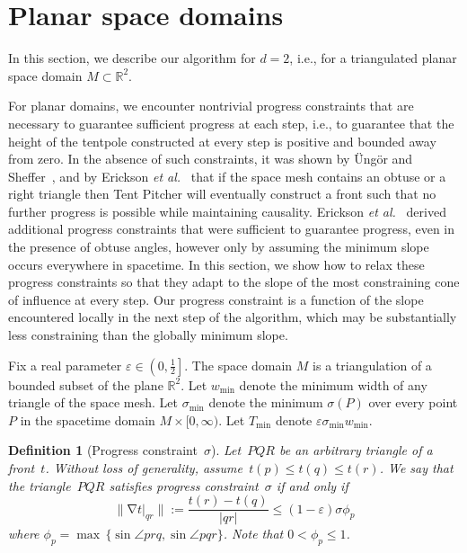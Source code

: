 \documentclass[twocolumn]{article}
\def\Real{\ensuremath{\mathbb{R}}}
\def\minW{\ensuremath{w_{\text{min}}}}
\def\S{\ensuremath{\sigma}}
\def\minS{\ensuremath{\S_{\text{min}}}}
\def\minT{\ensuremath{T_{\text{min}}}}
\def\e{\ensuremath{\varepsilon}}
\def\sp{\ensuremath{M}}
\def\fp{\ensuremath{P}}
\def\fq{\ensuremath{Q}}
\def\fr{\ensuremath{R}}
\DeclareMathOperator{\grad}{\ensuremath{\nabla}}
\def\abs#1{\ensuremath{\mathopen| #1 \mathclose|}}
\def\norm#1{\ensuremath{\mathopen\| #1 \mathclose\|}}
\def\rest#1#2{\ensuremath{\left. #1 \right|_{#2}}}
\def\half{\ensuremath{\frac{1}{2}}}
\def\etal{\textsl{et al.}}
\def\Ungor{\"Ung\"or}
\newtheorem{definition}{Definition}
\begin{document}
\section{Planar space domains}
\label{sec:2d}

In this section, we describe our algorithm for $d=2$, i.e., for a
triangulated planar space domain $\sp \subset \Real^2$.

For planar domains, we encounter nontrivial progress constraints that
are necessary to guarantee sufficient progress at each step, i.e., to
guarantee that the height of the tentpole constructed at every step is
positive and bounded away from zero.  In the absence of such
constraints, it was shown by \Ungor{} and
Sheffer~\cite{ungor00tentpitcher}, and by Erickson
\etal{}~\cite{erickson02building} that if the space mesh contains an
obtuse or a right triangle then Tent Pitcher will eventually construct
a front such that no further progress is possible while maintaining
causality.  Erickson \etal{}~\cite{erickson02building} derived
additional progress constraints that were sufficient to guarantee
progress, even in the presence of obtuse angles, however only by
assuming the minimum slope occurs everywhere in spacetime.  In this
section, we show how to relax these progress constraints so that they
adapt to the slope of the most constraining cone of influence at every
step.  Our progress constraint is a function of the slope encountered
locally in the next step of the algorithm, which may be substantially
less constraining than the globally minimum slope.

Fix a real parameter $\e \in \left(0,\half\right]$.  The space domain
$\sp$ is a triangulation of a bounded subset of the plane $\Real^2$.
Let $\minW$ denote the minimum width of any triangle of the space
mesh.  Let $\minS$ denote the minimum $\S(\fp)$ over every point $\fp$
in the spacetime domain $\sp \times [0,\infty)$.  Let $\minT$ denote
$\e \minS \minW$.

\begin{definition}[Progress constraint~$\S$]
  Let~$\fp\fq\fr$ be an arbitrary triangle of a front~$t$. Without
  loss of generality, assume~$t(p) \le t(q) \le t(r)$.  We say that
  the triangle~$\fp\fq\fr$ satisfies \emph{progress constraint~$\S$}
  if and only if
  \[ 
    \norm{\grad \rest{t}{qr}}
  :=
    \frac{t(r) - t(q)}{\abs{qr}}
  \le 
    (1-\e) \S \phi_p
  \]
  where $\phi_p = \max\,\{\sin \angle{prq}, \sin \angle{pqr}\}$.
  Note that $0 < \phi_p \le 1$.
\end{definition}
\end{document}
